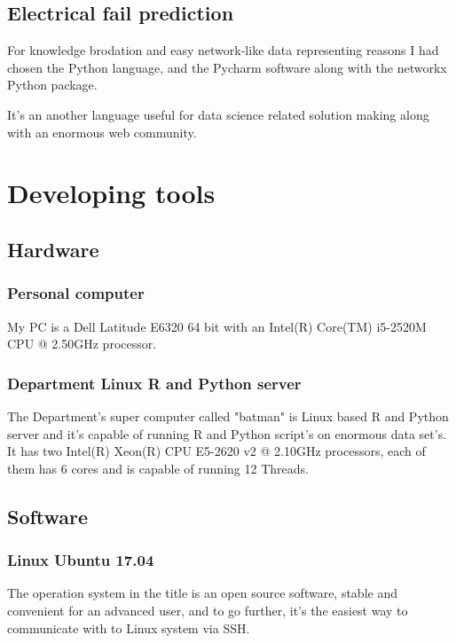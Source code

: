 		\subsection{Electrical fail prediction}
For knowledge brodation and easy network-like data representing reasons I had chosen the Python language, and the Pycharm software along with the networkx Python package.

It's an another language useful for data science related solution making along with an enormous web community.
	\section{Developing tools}
		\subsection{Hardware}
			\subsubsection{Personal computer}
My PC is a Dell Latitude E6320 64 bit with an Intel(R) Core(TM) i5-2520M CPU @ 2.50GHz processor.
\cite{Latitude}
			\subsubsection{Department Linux R and Python server}
The Department's super computer called "batman" is Linux based R and Python server and it's capable of running R and Python script's on enormous data set's. It has two Intel(R) Xeon(R) CPU E5-2620 v2 @ 2.10GHz processors, each of them has 6 cores and is capable of running 12 Threads.
\cite{Batman}
		\subsection{Software}
			\subsubsection{Linux Ubuntu 17.04}
The operation system in the title is an open source software, stable and convenient for an advanced user, and to go further, it's the easiest way to communicate with to Linux system via SSH.
\cite{Ubuntu}
